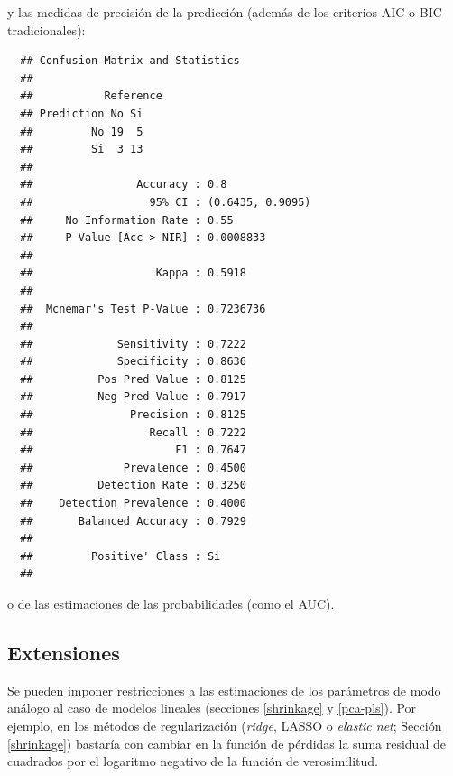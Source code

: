 \documentclass[
]{book}
\newenvironment{Shaded}{\begin{snugshade}}{\end{snugshade}}
\newcommand{\AttributeTok}[1]{\textcolor[rgb]{0.77,0.63,0.00}{#1}}
\newcommand{\FunctionTok}[1]{\textcolor[rgb]{0.00,0.00,0.00}{#1}}
\newcommand{\NormalTok}[1]{#1}
\newcommand{\SpecialCharTok}[1]{\textcolor[rgb]{0.00,0.00,0.00}{#1}}
\newcommand{\StringTok}[1]{\textcolor[rgb]{0.31,0.60,0.02}{#1}}
\theoremstyle{break}
\theoremstyle{nonumberplain}
\begin{document}
y las medidas de precisión de la predicción (además de los criterios AIC o BIC tradicionales):

\begin{Shaded}
\end{Shaded}

\begin{verbatim}
  ## Confusion Matrix and Statistics
  ## 
  ##           Reference
  ## Prediction No Si
  ##         No 19  5
  ##         Si  3 13
  ##                                           
  ##                Accuracy : 0.8             
  ##                  95% CI : (0.6435, 0.9095)
  ##     No Information Rate : 0.55            
  ##     P-Value [Acc > NIR] : 0.0008833       
  ##                                           
  ##                   Kappa : 0.5918          
  ##                                           
  ##  Mcnemar's Test P-Value : 0.7236736       
  ##                                           
  ##             Sensitivity : 0.7222          
  ##             Specificity : 0.8636          
  ##          Pos Pred Value : 0.8125          
  ##          Neg Pred Value : 0.7917          
  ##               Precision : 0.8125          
  ##                  Recall : 0.7222          
  ##                      F1 : 0.7647          
  ##              Prevalence : 0.4500          
  ##          Detection Rate : 0.3250          
  ##    Detection Prevalence : 0.4000          
  ##       Balanced Accuracy : 0.7929          
  ##                                           
  ##        'Positive' Class : Si              
  ## 
\end{verbatim}

o de las estimaciones de las probabilidades (como el AUC).

\hypertarget{extensiones}{%
\subsection{Extensiones}\label{extensiones}}

Se pueden imponer restricciones a las estimaciones de los parámetros de modo análogo al caso de modelos lineales (secciones \ref{shrinkage} y \ref{pca-pls}).
Por ejemplo, en los métodos de regularización (\emph{ridge}, LASSO o \emph{elastic net}; Sección \ref{shrinkage}) bastaría con cambiar en la función de pérdidas la suma residual de cuadrados por el logaritmo negativo de la función de verosimilitud.
\end{document}
